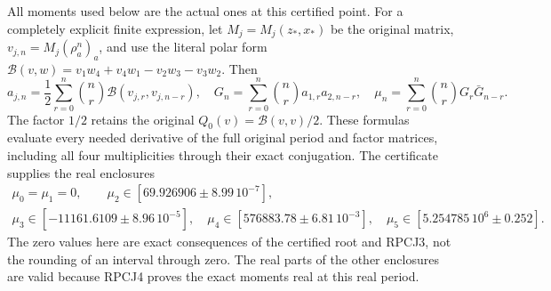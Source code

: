 \documentclass[11pt]{article}
\begin{document}
All moments used below are the actual ones at this certified point.
For a completely explicit finite expression, let $M_j=M_j(z_*,x_*)$
be the original matrix, $v_{j,n}=M_j(\rho_a^n)_a$, and use the
literal polar form
$\mathcal B(v,w)=v_1w_4+v_4w_1-v_2w_3-v_3w_2$.
Then
\[
 a_{j,n}=\frac12\sum_{r=0}^n\binom nr
            \mathcal B(v_{j,r},v_{j,n-r}),\quad
 G_n=\sum_{r=0}^n\binom nr a_{1,r}a_{2,n-r},\quad
 \mu_n=\sum_{r=0}^n\binom nrG_r\bar G_{n-r}.
 \tag{RPE2}
\]
The factor $1/2$ retains the original $Q_0(v)=\mathcal B(v,v)/2$.
These formulas evaluate every needed derivative of the full original
period and factor matrices, including all four multiplicities through
their exact conjugation. The certificate supplies the real enclosures
\[
 \begin{gathered}
 \mu_0=\mu_1=0,\qquad
 \mu_2\in[69.926906\mathbin\pm8.99\,10^{-7}],\\
 \mu_3\in[-11161.6109\mathbin\pm8.96\,10^{-5}],\quad
 \mu_4\in[576883.78\mathbin\pm6.81\,10^{-3}],\quad
 \mu_5\in[5.254785\,10^6\mathbin\pm0.252].
 \end{gathered}\tag{RPE3}
\]
The zero values here are exact consequences of the certified root
and RPCJ3, not the rounding of an interval through zero.
The real parts of the other enclosures are valid because RPCJ4
proves the exact moments real at this real period.
\end{document}
